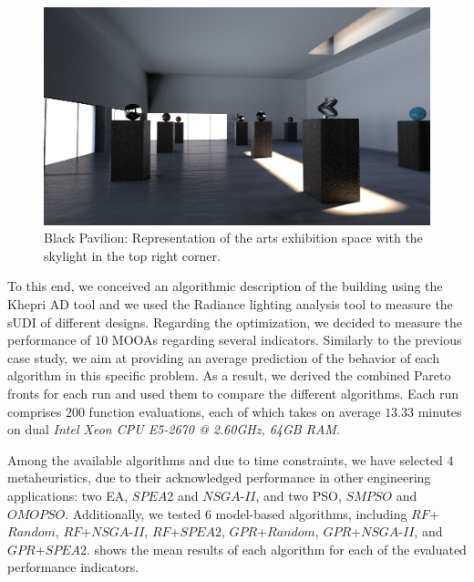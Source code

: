 \begin{figure}[htbp]
	\centering
	\includegraphics[width=\textwidth]{Images/Evaluation/BlackPavilion/PavPretoExample116x7204.png}
	\caption[Black Pavilion: Representation of the arts exhibition space with a skylight]{Black Pavilion: Representation of the arts exhibition space with the skylight in the top right corner.}
	\label{fig:blackpavilion}
\end{figure}

To this end, we conceived an algorithmic description of the building using the Khepri \ac{AD} tool and we used the Radiance lighting analysis tool to measure the \ac{sUDI} of different designs. Regarding the optimization, we decided to measure the performance of $10$ \acp{MOOA} regarding several indicators. Similarly to the previous case study, we aim at providing an average prediction of the behavior of each algorithm in this specific problem. As a result, we derived the combined Pareto fronts for each run and used them to compare the different algorithms. Each run comprises $200$ function evaluations, each of which takes on average $13.33$ minutes on dual \textit{Intel Xeon CPU E5-2670 @ 2.60GHz, 64GB RAM}.

Among the available algorithms and due to time constraints, we have selected $4$ metaheuristics, due to their acknowledged performance in other engineering applications: two \ac{EA}, $SPEA2$ and $NSGA$-$II$, and two \ac{PSO}, $SMPSO$ and $OMOPSO$. Additionally, we tested $6$ model-based algorithms, including $RF$+$Random$, $RF$+$NSGA$-$II$, $RF$+$SPEA2$, $GPR$+$Random$, $GPR$+$NSGA$-$II$, and $GPR$+$SPEA2$.  shows the mean results of each algorithm for each of the evaluated performance indicators. 

